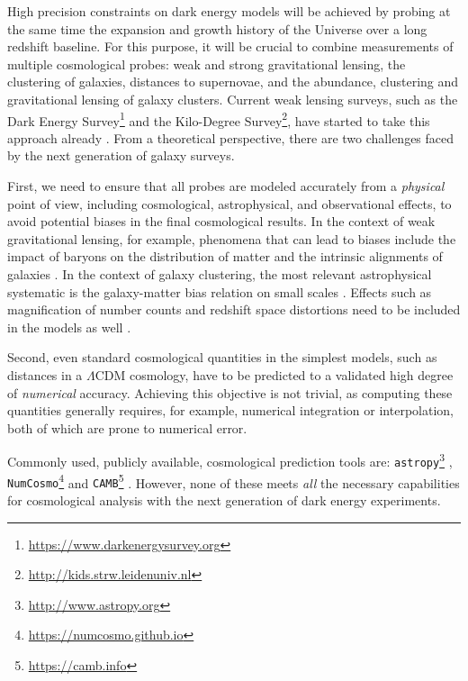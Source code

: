 \documentclass[\docopts]{\docclass}
\begin{document}
High precision constraints on dark energy models will be achieved by probing at the same time the expansion and growth history of the Universe over a long redshift baseline. For this purpose, it will be crucial to combine measurements of multiple cosmological probes: weak and strong gravitational lensing, the clustering of galaxies, distances to supernovae, and the abundance, clustering and gravitational lensing of galaxy clusters. Current weak lensing surveys, such as the Dark Energy Survey\footnote{\url{https://www.darkenergysurvey.org}} and the Kilo-Degree Survey\footnote{\url{http://kids.strw.leidenuniv.nl}}, have started to take this approach already \citep{Joudaki18,vanUitert18,DEScombined,krause17}. From a theoretical perspective, there are two challenges faced by the next generation of galaxy surveys. 

First, we need to ensure that all probes are modeled accurately from a {\it physical} point of view, including cosmological, astrophysical, and observational effects, to avoid potential biases in the final cosmological results. In the context of weak gravitational lensing, for example, phenomena that can lead to biases include the impact of baryons on the distribution of matter and the intrinsic alignments of galaxies \citep[e.g.][]{vanDaalen11,Semboloni11,Troxel14,Krause15,Blazek17,Chisari18}. In the context of galaxy clustering, the most relevant astrophysical systematic is the galaxy-matter bias relation on small scales \citep{2013MNRAS.436.2038Z,2016arXiv161109787D}. Effects such as magnification of number counts and redshift space distortions need to be included in the models as well \citep{Alonso15,ghosh18}. 

Second, even standard cosmological quantities in the simplest models, such as distances in a $\Lambda$CDM cosmology, have to be predicted to a validated high degree of {\it numerical} accuracy. Achieving this objective is not trivial, as computing these quantities generally requires, for example, numerical integration or interpolation, both of which are prone to numerical error.

Commonly used, publicly available, cosmological prediction tools are: {\tt astropy}\footnote{\url{http://www.astropy.org}} \citep{astropy}, {\tt NumCosmo}\footnote{\url{https://numcosmo.github.io}} \citep{numcosmo} and {\tt CAMB}\footnote{\url{https://camb.info}} \citep{camb}. However, none of these meets {\it all} the necessary capabilities for cosmological analysis with the next generation of dark energy experiments.
\end{document}
